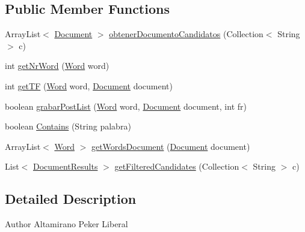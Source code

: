 \subsection*{\-Public \-Member \-Functions}
\begin{DoxyCompactItemize}
\item 
\-Array\-List$<$ \hyperlink{classcom_1_1utn_1_1searchengine_1_1_document}{\-Document} $>$ \hyperlink{classdataaccess_1_1postgresql_1_1_postgre_s_q_l_post_list_d_a_o_a1ef85476551ad259886a7683054a8efc}{obtener\-Documento\-Candidatos} (\-Collection$<$ \-String $>$ c)
\item 
int \hyperlink{classdataaccess_1_1postgresql_1_1_postgre_s_q_l_post_list_d_a_o_a9f53887bb6b093f5539ab29b747a0ea6}{get\-Nr\-Word} (\hyperlink{classcom_1_1utn_1_1searchengine_1_1_word}{\-Word} word)
\item 
int \hyperlink{classdataaccess_1_1postgresql_1_1_postgre_s_q_l_post_list_d_a_o_a9cbdbd5df3be84767ad2d3cfe75ec608}{get\-T\-F} (\hyperlink{classcom_1_1utn_1_1searchengine_1_1_word}{\-Word} word, \hyperlink{classcom_1_1utn_1_1searchengine_1_1_document}{\-Document} document)
\item 
boolean \hyperlink{classdataaccess_1_1postgresql_1_1_postgre_s_q_l_post_list_d_a_o_ad8afd230c04a70252ecfd9b3e146245f}{grabar\-Post\-List} (\hyperlink{classcom_1_1utn_1_1searchengine_1_1_word}{\-Word} word, \hyperlink{classcom_1_1utn_1_1searchengine_1_1_document}{\-Document} document, int fr)
\item 
boolean \hyperlink{classdataaccess_1_1postgresql_1_1_postgre_s_q_l_post_list_d_a_o_ad60674df8151d0ad68a7116bba5297b9}{\-Contains} (\-String palabra)
\item 
\-Array\-List$<$ \hyperlink{classcom_1_1utn_1_1searchengine_1_1_word}{\-Word} $>$ \hyperlink{classdataaccess_1_1postgresql_1_1_postgre_s_q_l_post_list_d_a_o_a08dd503b058dc03570751af250b20fe2}{get\-Words\-Document} (\hyperlink{classcom_1_1utn_1_1searchengine_1_1_document}{\-Document} document)
\item 
\-List$<$ \hyperlink{classcom_1_1utn_1_1searchengine_1_1_document_results}{\-Document\-Results} $>$ \hyperlink{classdataaccess_1_1postgresql_1_1_postgre_s_q_l_post_list_d_a_o_a3dbc10958c2c69645f508637510ad10e}{get\-Filtered\-Candidates} (\-Collection$<$ \-String $>$ c)
\end{DoxyCompactItemize}


\subsection{\-Detailed \-Description}
\begin{DoxyAuthor}{\-Author}
\-Altamirano \-Peker \-Liberal 
\end{DoxyAuthor}


